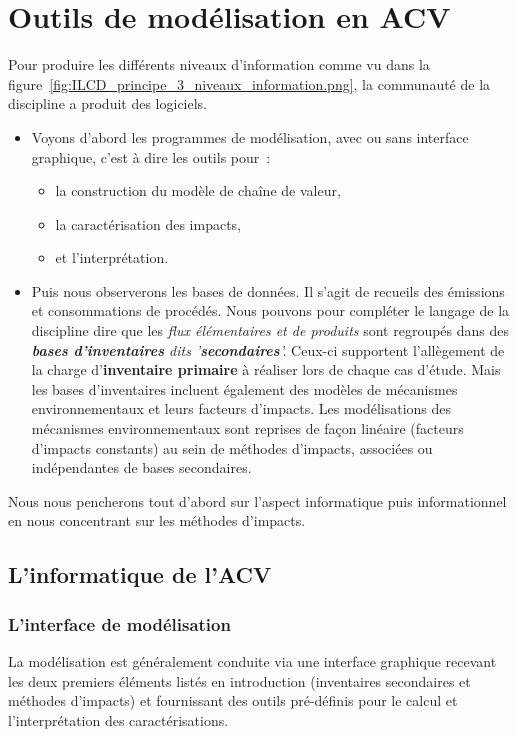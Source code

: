 \section{Outils de modélisation en ACV}
\label{sec:Outils de modélisation en ACV}
Pour produire les différents niveaux d'information comme vu dans la figure~\ref{fig:ILCD_principe_3_niveaux_information.png}, la communauté de la discipline a produit des logiciels.

\begin{itemize}
\item Voyons d'abord les programmes de modélisation, avec ou sans interface graphique, c'est à dire les outils pour~:
\begin{itemize}[noitemsep]
\item la construction du modèle de chaîne de valeur,
\item la caractérisation des impacts,
\item et l'interprétation.
\end{itemize} 
\item Puis nous observerons les bases de données.
Il s'agit de recueils des émissions et consommations de procédés.
Nous pouvons pour compléter le langage de la discipline dire que les \emph{flux élémentaires et de produits} sont regroupés dans des \emph{\textbf{bases d'inventaires} dits '\textbf{secondaires}'.}
Ceux-ci supportent l'allègement de la charge d'\textbf{inventaire primaire} à réaliser lors de chaque cas d'étude.
Mais les bases d'inventaires incluent également des modèles de mécanismes environnementaux et leurs facteurs d'impacts.
Les modélisations des mécanismes environnementaux sont reprises de façon linéaire (facteurs d'impacts constants) au sein de méthodes d'impacts, associées ou indépendantes de bases secondaires.
\end{itemize} 
Nous nous pencherons tout d'abord sur l'aspect informatique puis informationnel en nous concentrant sur les méthodes d'impacts.
\subsection{L'informatique de l'ACV}
\label{subsec:L'informatique de l'ACV}
\subsubsection{L'interface de modélisation}
\label{subsec:L'interface de modélisation}
La modélisation est généralement conduite via une interface graphique recevant les deux premiers éléments listés en introduction (inventaires secondaires et méthodes d'impacts) et fournissant des outils pré-définis pour le calcul et l'interprétation des caractérisations.

